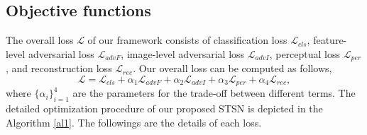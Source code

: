 \documentclass[10pt,journal,compsoc,twocolumn ]{IEEEtran}
\begin{document}
\subsection{Objective functions} \label{training loss}

The overall loss $\mathcal{L}$ of our framework consists of classification loss $\mathcal{L}_{cls}$, feature-level adversarial loss $\mathcal{L}_{advF}$, image-level adversarial loss $\mathcal{L}_{advI}$, perceptual loss $\mathcal{L}_{per}$, and reconstruction loss $\mathcal{L}_{rec}$. Our overall loss can be computed as follows,
\begin{equation}
\mathcal{L} = \mathcal{L}_{cls}+\alpha_1\mathcal{L}_{advF}+\alpha_2\mathcal{L}_{advI}+\alpha_3\mathcal{L}_{per}+\alpha_4\mathcal{L}_{rec}, \label{total}
\end{equation}
where $\{\alpha_i\}_{i=1}^4$ are the parameters for the trade-off between different terms. The detailed optimization procedure of our proposed STSN is depicted in the Algorithm \ref{al1}. The followings are the details of each loss.
\end{document}
